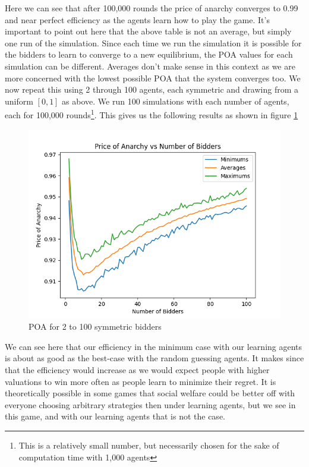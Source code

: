 \documentclass[12pt,twoside]{reedthesis}
\begin{document}
Here we can see that after 100,000 rounds the price of anarchy converges to 0.99 and near perfect efficiency as the agents learn how to play the game. It's important to point out here that the above table is not an average, but simply one run of the simulation. Since each time we run the simulation it is possible for the bidders to learn to converge to a new equilibrium, the POA values for each simulation can be different. Averages don't make sense in this context as we are more concerned with the lowest possible POA that the system converges too. We now repeat this using 2 through 100 agents, each symmetric and drawing from a uniform $[0,1]$ as above. We run 100 simulations with each number of agents, each for 100,000 rounds\footnote{This is a relatively small number, but necessarily chosen for the sake of computation time with 1,000 agents}. This gives us the following results as shown in figure \ref{figure:symmetric} 

\begin{figure}[h!]
	\centering
	\includegraphics[scale=.8]{Figures/symmetric}
	\caption{POA for 2 to 100 symmetric bidders}
	\label{figure:symmetric}
\end{figure}

We can see here that our efficiency in the minimum case with our learning agents is about as good as the best-case with the random guessing agents. It makes since that the efficiency would increase as we would expect people with higher valuations to win more often as people learn to minimize their regret. It is theoretically possible in some games that social welfare could be better off with everyone choosing arbitrary strategies then under learning agents, but we see in this game, and with our learning agents that is not the case. 
\end{document}
